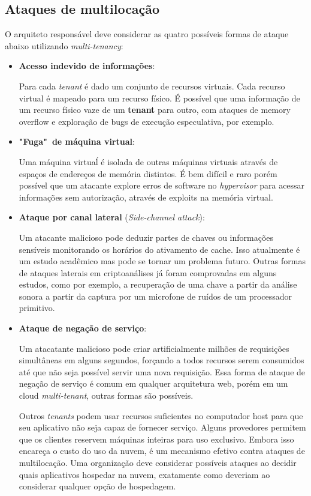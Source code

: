 \subsection{Ataques de multilocação}
O arquiteto responsável deve considerar as quatro possíveis formas de ataque abaixo utilizando \textit{multi-tenancy}:
\begin{itemize}
	\item
	\textbf{Acesso indevido de informações}: 

	Para cada \textit{tenant} é dado um conjunto de recursos virtuais. Cada recurso virtual é mapeado para um recurso físico. É possível que uma informação de um recurso físico vaze de um \textbf{tenant} para outro, com ataques de memory overflow e exploração de bugs de execução especulativa, por exemplo.

	\item
	\textbf{"Fuga"~de máquina virtual}: 

	Uma máquina virtuaĺ é isolada de outras máquinas virtuais através de espaços de endereços de memória distintos. É bem difícil e raro porém possível que um atacante explore erros de software no \textit{hypervisor} para acessar informações sem autorização, através de exploits na memória virtual.

	\item
	\textbf{Ataque por canal lateral } (\textit{Side-channel attack}): 

	Um atacante malicioso pode deduzir partes de chaves ou informações sensíveis monitorando os horários do ativamento de cache. Isso atualmente é um estudo acadêmico mas pode se tornar um problema futuro. Outras formas de ataques laterais em criptoanálises já foram comprovadas em alguns estudos, como por exemplo, a recuperação de uma chave a partir da análise sonora a partir da captura por um microfone de ruídos de um processador primitivo. 

	\item
	\textbf{Ataque de negação de serviço}:

	Um atacatante malicioso pode criar artificialmente milhões de requisições simultâneas em alguns segundos, forçando a todos recursos serem consumidos até que não seja possível servir uma nova requisição. Essa forma de ataque de negação de serviço é comum em qualquer arquitetura web, porém em um cloud \textit{multi-tenant}, outras formas são possíveis.

	Outros \textit{tenants} podem usar recursos suficientes no computador host para que seu aplicativo não seja capaz de fornecer serviço. Alguns provedores permitem que os clientes reservem máquinas inteiras para uso exclusivo. Embora isso encareça o custo do uso da nuvem, é um mecanismo efetivo contra ataques de multilocação. Uma organização deve considerar possíveis ataques ao decidir quais aplicativos hospedar na nuvem, exatamente como deveriam ao considerar qualquer opção de hospedagem.
\end{itemize}
